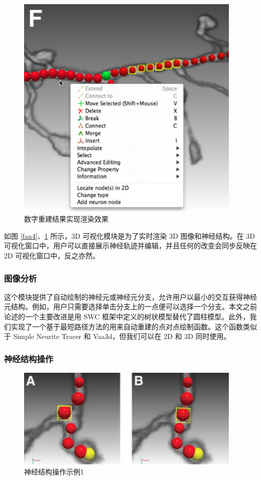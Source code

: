 {\begin{figure}
\centering
\includegraphics[width=108mm]{images/3f}
\caption{数字重建结果实现渲染效果}
\label{fan5}
\end{figure}

如图 \ref{fan4}、\ref{fan5} 所示，3D 可视化模块是为了实时渲染 3D 图像和神经结构。在 3D 可视化窗口中，用户可以直接展示神经轨迹并编辑，并且任何的改变会同步反映在 2D 可视化窗口中，反之亦然。

\subsubsection{图像分析}
这个模块提供了自动绘制的神经元或神经元分支，允许用户以最小的交互获得神经元结构。例如，用户只需要选择单击分支上的一点便可以选择一个分支。本文之前论述的一个主要改进是用 SWC 框架中定义的树状模型替代了圆柱模型。此外，我们实现了一个基于最短路径方法的用来自动重建的点对点绘制函数。这个函数类似于 Simple Neurite Tracer 和 Vaa3d，但我们可以在 2D 和 3D 同时使用。

\subsubsection{神经结构操作}
\begin{figure}
\centering
\includegraphics[width=108mm]{images/t6}
\caption{神经结构操作示例1}
\label{fan6}
\end{figure}

}
